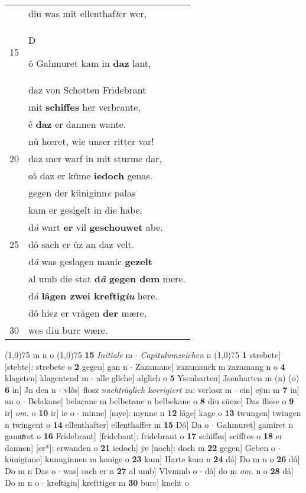 \documentclass[8pt,a4paper,notitlepage]{article}
\begin{document}
\begin{table}[ht]
\begin{minipage}[t]{0.5\linewidth}
\begin{tabular}{rl}
 & diu was mit ellenthaf\textit{t}er wer,\\ 
15 & \begin{large}D\end{large}ô Gahmuret kam in \textbf{daz} lant,\\ 
 & daz von Schotten Fridebrant\\ 
 & mit \textbf{schiffes} her verbrante,\\ 
 & ê \textbf{daz} er dannen wante.\\ 
 & nû hœret, wie unser ritter var!\\ 
20 & daz mer warf in mit sturme dar,\\ 
 & sô daz er kûme \textbf{iedoch} genas.\\ 
 & gegen der küniginn\textit{e} palas\\ 
 & kam er gesigelt in die habe.\\ 
 & d\textit{â} wart \textbf{er} vil \textbf{geschouwet} abe.\\ 
25 & dô sach er ûz an daz velt.\\ 
 & d\textit{â} was geslagen manic \textbf{gezelt}\\ 
 & al umb die stat \textbf{d\textit{â}} \textbf{gegen dem} mere.\\ 
 & d\textit{â} \textbf{lâgen zwei kreftig\textit{iu}} here.\\ 
 & dô hiez er vrâgen \textbf{der} mære,\\ 
30 & wes diu burc wære.\\ 
\end{tabular}
\scriptsize
\line(1,0){75} \newline
m n o \newline
\line(1,0){75} \newline
\textbf{15} \textit{Initiale} m   $\cdot$ \textit{Capitulumzeichen} n  \newline
\line(1,0){75} \newline
\textbf{1} strebete] [stebte]: strebete o \textbf{2} gegen] gan n  $\cdot$ Zazamanc] zazamanck m zazamang n o \textbf{4} klageten] klagentend m  $\cdot$ alle glîche] alglich o \textbf{5} Ysenharten] Jsenharten m (n) (o) \textbf{6} in] Jn den n  $\cdot$ vlôs] flosz \textit{nachträglich korrigiert zu:} verlosz m  $\cdot$ ein] eÿm m \textbf{7} in] an o  $\cdot$ Belakane] belacane m belbetane n belbekane o \textbf{8} diu süeze] Das flisse o \textbf{9} ir] \textit{om.} o \textbf{10} ir] ie o  $\cdot$ minne] [mye]: mynne n \textbf{12} lâge] kage o \textbf{13} twungen] twingen n twingent o \textbf{14} ellenthafter] ellenthaffer m \textbf{15} Dô] Da o  $\cdot$ Gahmuret] gamiret n gamuͯret o \textbf{16} Fridebrant] [fridebant]: fridebrant o \textbf{17} schiffes] scifftes o \textbf{18} er dannen] [er*]: erwanden o \textbf{21} iedoch] ÿe [noch]: doch m \textbf{22} gegen] Geben o  $\cdot$ küniginne] kunnginnen m konige o \textbf{23} kam] Harte kam n \textbf{24} dâ] Do m n o \textbf{26} dâ] Do m n Das o  $\cdot$ was] sach er n \textbf{27} al umb] Vlvmmb o  $\cdot$ dâ] do m \textit{om.} n o \textbf{28} dâ] Do m n o  $\cdot$ kreftigiu] krefttiger m \textbf{30} burc] kneht o \newline
\end{minipage}
\end{table}
\end{document}
